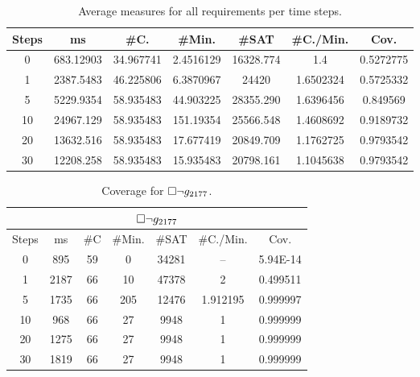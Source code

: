 \begin{table}[!t]
\centering
\caption{Average measures for all requirements per time steps.}
{
\begin{tabular}{|c|c|c|c|c|c|c|}
\hline
Steps & ms &  \#C. & \#Min. & \#SAT & \#C./Min. & Cov.\\
\hline
0 & 683.12903 & 34.967741 & 2.4516129 & 16328.774 & 1.4 & 0.5272775\\
1 & 2387.5483 & 46.225806 & 6.3870967 & 24420 & 1.6502324 & 0.5725332\\
5 & 5229.9354 & 58.935483 & 44.903225 & 28355.290 & 1.6396456 & 0.849569\\
10 & 24967.129 & 58.935483 & 151.19354 & 25566.548 & 1.4608692 & 0.9189732\\
20 & 13632.516 & 58.935483 & 17.677419 & 20849.709 & 1.1762725 & 0.9793542\\
30 & 12208.258 & 58.935483 & 15.935483 & 20798.161 & 1.1045638 & 0.9793542\\
\hline
\end{tabular}}
\label{tab:pdt}
\end{table}
\begin{table}[!t]
\centering
\caption{Coverage for ${{\square}} \lnot g_{2177}$.}
{
\begin{tabular}{|c|c|c|c|c|c|c|}
\hline
\multicolumn{7}{|c|}{${{\square}} \lnot g_{2177}$} \\
\hline
Steps & ms & \#C & \#Min. & \#SAT & \#C./Min. & Cov.\\
\hline
0 & 895 & 59 & 0 & 34281 & -- & 5.94E-14\\
1 & 2187 & 66 & 10 & 47378 & 2 & 0.499511\\
5 & 1735 & 66 & 205 & 12476 & 1.912195 & 0.999997\\
10 & 968 & 66 & 27 & 9948 & 1 & 0.999999\\
20 & 1275 & 66 & 27 & 9948 & 1 & 0.999999\\
30 & 1819 & 66 & 27 & 9948 & 1 & 0.999999\\
 \hline
\end{tabular}
}
\label{tab:pdt2324}
\end{table}

